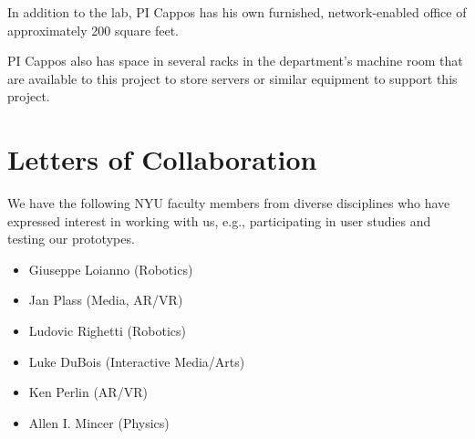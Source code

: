 In addition to the lab, PI Cappos has his own furnished, network-enabled office
of approximately 200 square feet.

PI Cappos also has space in several racks in the department's
machine room that are available to this project to store servers or similar
equipment to support this project.




\section*{Letters of Collaboration}

We have the following NYU faculty members from diverse disciplines who have expressed interest in working with us, e.g., participating in user studies and testing our prototypes.

\begin{itemize}[nolistsep]
    \item Giuseppe Loianno (Robotics)
    \item Jan Plass (Media, AR/VR)
    \item Ludovic Righetti (Robotics)
    \item Luke DuBois (Interactive Media/Arts)
    \item Ken Perlin (AR/VR)
    \item Allen I. Mincer (Physics)
\end{itemize}

